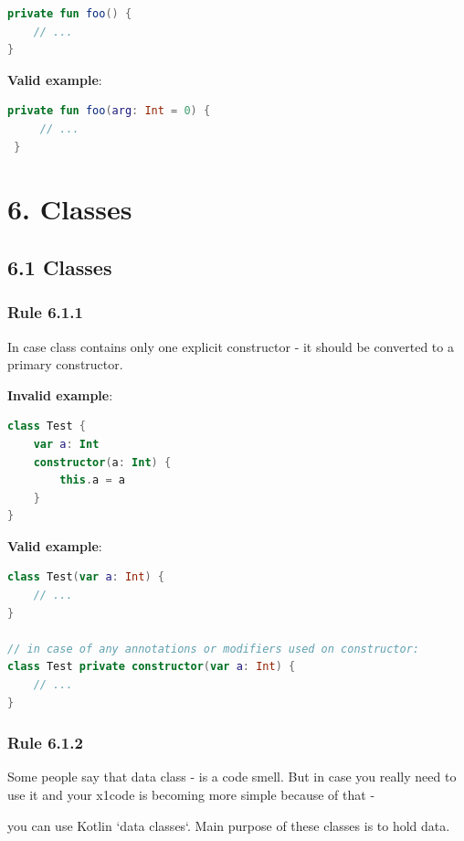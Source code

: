 {{{{\begin{lstlisting}[language=Kotlin]
private fun foo() {
    // ...
}
\end{lstlisting}


\textbf{Valid example}:

\begin{lstlisting}[language=Kotlin]
 private fun foo(arg: Int = 0) {
     // ...
 }
\end{lstlisting}
\section*{\textbf{6. Classes}}

\subsection*{\textbf{6.1 Classes}}

\subsubsection*{\textbf{Rule 6.1.1}}
\leavevmode\newline

In case class contains only one explicit constructor - it should be converted to a primary constructor.



\textbf{Invalid example}:

\begin{lstlisting}[language=Kotlin]
class Test {
    var a: Int
    constructor(a: Int) {
        this.a = a
    }
}
\end{lstlisting}


\textbf{Valid example}:

\begin{lstlisting}[language=Kotlin]
class Test(var a: Int) { 
    // ...
}

// in case of any annotations or modifiers used on constructor:
class Test private constructor(var a: Int) { 
    // ...
}
\end{lstlisting}


\subsubsection*{\textbf{Rule 6.1.2}}
\leavevmode\newline

Some people say that data class - is a code smell. But in case you really need to use it and your x1code is becoming more simple because of that -

you can use Kotlin `data classes`. Main purpose of these classes is to hold data.

}}}}
